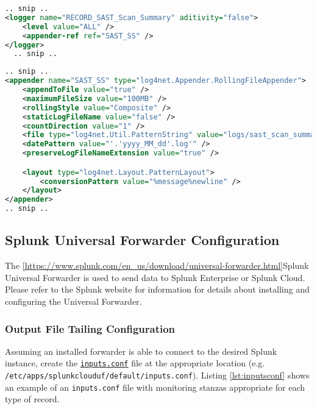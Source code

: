 \begin{lstlisting}[caption={Log4Net Logger Configurations}, label={lst:record_loggers}, language=XML]
.. snip ..
<logger name="RECORD_SAST_Scan_Summary" aditivity="false">
    <level value="ALL" />
    <appender-ref ref="SAST_SS" />
</logger>
  .. snip ..
\end{lstlisting}

\begin{lstlisting}[caption={Log4Net Record File Appenders}, label={lst:record_appenders}, language=XML]
.. snip ..
<appender name="SAST_SS" type="log4net.Appender.RollingFileAppender">
    <appendToFile value="true" />
    <maximumFileSize value="100MB" />
    <rollingStyle value="Composite" />
    <staticLogFileName value="false" />
    <countDirection value="1" />
    <file type="log4net.Util.PatternString" value="logs/sast_scan_summary" />
    <datePattern value="'.'yyyy_MM_dd'.log'" />
    <preserveLogFileNameExtension value="true" />

    <layout type="log4net.Layout.PatternLayout">
        <conversionPattern value="%message%newline" />
    </layout>
</appender>
.. snip ..
\end{lstlisting}

\subsection{Splunk Universal Forwarder Configuration}
The \ref{https://www.splunk.com/en_us/download/universal-forwarder.html}{Splunk Universal Forwarder} is used to send data to Splunk Enterprise or Splunk Cloud.  
Please refer to the Splunk website for information for details about installing and configuring the Universal Forwarder.


\subsubsection{Output File Tailing Configuration}

Assuming an installed forwarder is able to connect to the desired Splunk instance, 
create the \href{https://docs.splunk.com/Documentation/Splunk/latest/Admin/Inputsconf}{\texttt{inputs.conf}} file at the appropriate location 
(e.g. \texttt{/etc/apps/splunkclouduf/default/inputs.conf}).  Listing \ref{lst:inputsconf} shows an example of an \texttt{inputs.conf}
file with monitoring stanzas appropriate for each type of record. 


